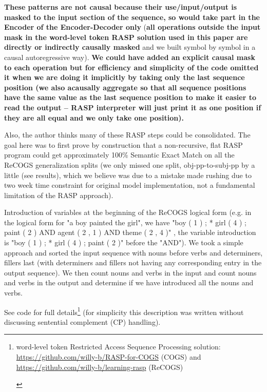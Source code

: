 \documentclass[11pt]{article}
\begin{document}
\textbf{These patterns are not causal because their use/input/output is masked to the input section of the sequence, so would take part in the Encoder of the Encoder-Decoder only} (\textbf{all operations outside the input mask in the word-level token RASP solution used in this paper are directly or indirectly causally masked} and we built symbol by symbol in a causal autoregressive way). \textbf{We could have added an explicit causal mask to each operation but for efficiency and simplicity of the code omitted it when we are doing it implicitly by taking only the last sequence position (we also acausally aggregate so that all sequence positions have the same value as the last sequence position to make it easier to read the output -- RASP interpreter will just print it as one position if they are all equal and we only take one position).}

Also, the author thinks many of these RASP steps could be consolidated. The goal here was to first prove by construction that a non-recursive, flat RASP program could get approximately 100\% Semantic Exact Match on all the ReCOGS generalization splits (we only missed one split, obj-pp-to-subj-pp by a little (see results), which we believe was due to a mistake made rushing due to two week time constraint for original model implementation, not a fundamental limitation of the RASP approach).

Introduction of variables at the beginning of the ReCOGS logical form (e.g. in the logical form for "a boy painted the girl", we have "boy ( 1 ) ; * girl ( 4 ) ; paint ( 2 ) AND agent ( 2 , 1 ) AND theme ( 2 , 4 )" , the variable introduction is "boy ( 1 ) ; * girl ( 4 ) ; paint ( 2 )" before the "AND"). We took a simple approach and sorted the input sequence with nouns before verbs and determiners, fillers last (with determiners and fillers not having any corresponding entry in the output sequence). We then count nouns and verbs in the input and count nouns and verbs in the output and determine if we have introduced all the nouns and verbs.

See code for full details\footnote{\begin{footnotesize}word-level token Restricted Access Sequence Processing solution: \href{https://github.com/willy-b/RASP-for-COGS}{https://github.com/willy-b/RASP-for-COGS} (COGS) and \href{https://github.com/willy-b/learning-rasp}{https://github.com/willy-b/learning-rasp} (ReCOGS)\end{footnotesize}} (for simplicity this description was written without discussing sentential complement (CP) handling).
\end{document}
